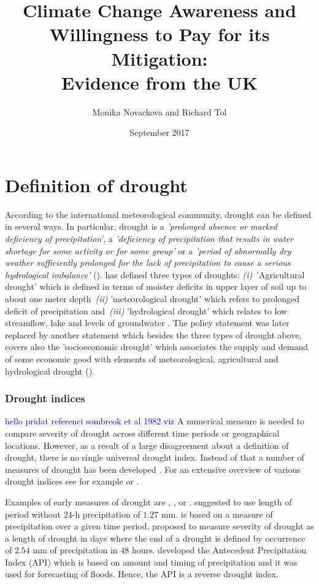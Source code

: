 \documentclass[a4paper,12pt]{article}
\date{\normalsize{September 2017}}
\title{\Large \bf Climate Change Awareness and Willingness to Pay for its Mitigation: \\ Evidence from the UK}
\author{Monika Novackova and Richard Tol}
\affil{\small{Department of Economics, University of Sussex, Falmer, UK}}
\begin{document}
\sloppy
\section*{Definition of drought}
According to the international meteorological community, drought can be defined in several ways. In particular, drought is a \textit{'prolonged absence or marked deficiency of precipitation'}, a \textit{'deficiency of precipitation that results in water shortage for some activity or for some group'} or a \textit{'period of abnormally dry weather sufficiently prolonged for the lack of precipitation to cause a serious hydrological imbalance'} (\citealp{Heim2002, IPCCtrenberth}).
 \cite{AMS1997} has defined three types of droughts: \textit{(i)}~'Agricultural drought' which is defined in terms of moister deficits in upper layer of soil up to about one meter depth~\textit{(ii)} 'meteorological drought' which refers to prolonged deficit of precipitation and~\textit{(iii)} 'hydrological drought' which relates to low streamflow, lake and levels of groundwater . The  \cite{AMS1997} policy statement was later replaced by another statement \citep{AMS2013} which besides the three types of drought above, covers also the 'socioeconomic drought' which associates the supply and demand of some economic good with elements of meteorological, agricultural and hydrological drought (\citealt{Heim2002, IPCCtrenberth}).

\subsubsection*{Drought indices}
\textcolor{blue}{hello pridat referenci  sombreok et al 1982 viz \cite{kabubo2007}}
A numerical measure is needed to compare severity of drought across different time periods or geographical locations. However, as a result of a large disagreement about a definition of drought, there is no single universal drought index. Instead of that a number of measures of drought has been developed \citep{Heim2002}. For an extensive overview of various drought indices see for example  \cite{Heim2002} or \cite{keyantash2002}.

Examples of early measures of drought are \cite{wilhite1985}, \cite{munger1916}, \cite{blumenstock1942} or \cite{mcquigg1954}. \cite{munger1916} suggested to use length of period without $24$-h precipitation of $1.27$ mm. \cite{wilhite1985} is based on a measure of precipitation over a given time period. \cite{blumenstock1942} proposed to measure severity of drought as a length of drought in days where the end of a drought is defined by occurrence of $2.54$ mm of precipitation in $48$ hours. \cite{mcquigg1954} developed the Antecedent Precipitation Index (API) which is based on amount and timing of precipitation and it was used for forecasting of floods. Hence, the API is a reverse drought index.
\end{document}
